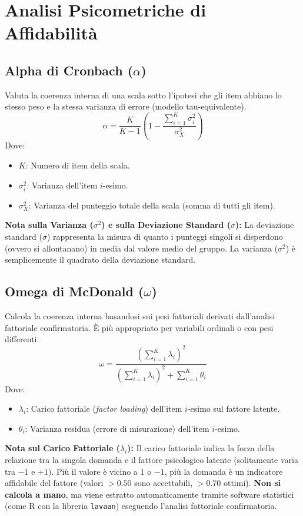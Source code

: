 \documentclass[11pt,a4paper]{article}
\begin{document}
\section{Analisi Psicometriche di Affidabilità}

\subsection{Alpha di Cronbach ($\alpha$)}
Valuta la coerenza interna di una scala sotto l'ipotesi che gli item abbiano lo stesso peso e la stessa varianza di errore (modello tau-equivalente).
\begin{equation}
\alpha = \frac{K}{K - 1} \left( 1 - \frac{\sum_{i=1}^K \sigma^2_i}{\sigma^2_X} \right)
\end{equation}
Dove:
\begin{itemize}
    \item $K$: Numero di item della scala.
    \item $\sigma^2_i$: Varianza dell'item $i$-esimo.
    \item $\sigma^2_X$: Varianza del punteggio totale della scala (somma di tutti gli item).
\end{itemize}
\textbf{Nota sulla Varianza ($\sigma^2$) e sulla Deviazione Standard ($\sigma$):} La deviazione standard ($\sigma$) rappresenta la misura di quanto i punteggi singoli si disperdono (ovvero si allontanano) in media dal valore medio del gruppo. La varianza ($\sigma^2$) è semplicemente il quadrato della deviazione standard.

\subsection{Omega di McDonald ($\omega$)}
Calcola la coerenza interna basandosi sui pesi fattoriali derivati dall'analisi fattoriale confirmatoria. È più appropriato per variabili ordinali o con pesi differenti.
\begin{equation}
\omega = \frac{\left( \sum_{i=1}^K \lambda_i \right)^2}{\left( \sum_{i=1}^K \lambda_i \right)^2 + \sum_{i=1}^K \theta_i}
\end{equation}
Dove:
\begin{itemize}
    \item $\lambda_i$: Carico fattoriale (\textit{factor loading}) dell'item $i$-esimo sul fattore latente.
    \item $\theta_i$: Varianza residua (errore di misurazione) dell'item $i$-esimo.
\end{itemize}
\textbf{Nota sul Carico Fattoriale ($\lambda_i$):} Il carico fattoriale indica la forza della relazione tra la singola domanda e il fattore psicologico latente (solitamente varia tra $-1$ e $+1$). Più il valore è vicino a $1$ o $-1$, più la domanda è un indicatore affidabile del fattore (valori $> 0.50$ sono accettabili, $> 0.70$ ottimi). \textbf{Non si calcola a mano}, ma viene estratto automaticamente tramite software statistici (come R con la libreria \texttt{lavaan}) eseguendo l'analisi fattoriale confirmatoria.
\end{document}
